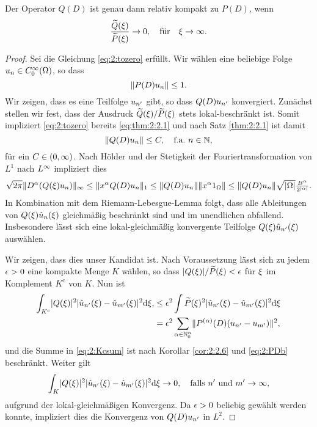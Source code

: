 \begin{thm}
Der Operator $Q(D)$ ist genau dann relativ kompakt zu $P(D)$,
wenn
\begin{equation}\label{eq:2:tozero}
\frac{\widetilde{Q}(\xi)}{\widetilde{P}(\xi)}\to0,\quad\text{für}\quad\xi\to\infty.
\end{equation}
\end{thm}
\begin{proof}
Sei die Gleichung \eqref{eq:2:tozero} erfüllt.
Wir wählen eine beliebige Folge $u_n\in C^\infty_0(\Omega)$,
so dass 
\begin{equation}\label{eq:2:PDb}
\lVert P(D)u_n\rVert\leq1.
\end{equation}
Wir zeigen, dass es eine Teilfolge $u_{n^\prime}$ gibt,
so dass $Q(D)u_{n^\prime}$ konvergiert.
Zunächst stellen wir fest, dass der Ausdruck $\widetilde{Q}(\xi)/\widetilde{P}(\xi)$
stets lokal-beschränkt ist.
Somit impliziert \eqref{eq:2:tozero} bereits \eqref{eq:thm:2:2.1}
und nach Satz \ref{thm:2:2.1} ist damit
\begin{equation}
\lVert Q(D)u_n\rVert\leq C,
\quad\text{f.a.}~n\in\mathbb N,
\end{equation}
für ein $C\in(0,\infty)$.
Nach Hölder und der Stetigkeit der Fouriertransformation
von $L^1$ nach $L^\infty$ impliziert dies
\begin{equation}
\sqrt{2\pi}\lVert D^\alpha(Q(\xi)u_n)\rVert_\infty\leq\lVert x^\alpha Q(D)u_n\rVert_1\leq\lVert Q(D)u_n\rVert\lVert x^\alpha1_\Omega\rVert
\leq\lVert Q(D)u_n\rVert\sqrt{\lvert\Omega\rvert}\tfrac{B^\alpha}{2^{\lvert\alpha\rvert}}.
\end{equation}
In Kombination mit dem Riemann-Lebesgue-Lemma folgt,
dass alle Ableitungen von $Q(\xi)\hat{u}_n(\xi)$
gleichmäßig beschränkt sind und im unendlichen abfallend.
Insbesondere lässt sich eine lokal-gleichmäßig konvergente Teilfolge $Q(\xi)\hat{u}_{n^\prime}(\xi)$ auswählen.

Wir zeigen, dass dies unser Kandidat ist.
Nach Voraussetzung lässt sich zu jedem $\epsilon>0$ eine kompakte Menge $K$ wählen,
so dass $\lvert Q(\xi)\rvert/\widetilde{P}(\xi)<\epsilon$ für $\xi$ im Komplement $K^{\mathrm c}$ von $K$.
Nun ist
\begin{align}
\int_{K^{\mathrm c}}\lvert Q(\xi)\rvert^2\lvert\hat{u}_{n^\prime}(\xi)-\hat{u}_{m^\prime}(\xi)\rvert^2\mathrm{d}\xi,
&\leq\epsilon^2\int\widetilde{P}(\xi)^2\lvert\hat{u}_{n^\prime}(\xi)-\hat{u}_{m^\prime}(\xi)\rvert^2\mathrm{d}\xi\\
&=\epsilon^2\sum_{\alpha\in\mathbb N^n_0}\lVert P^{(\alpha)}(D)(u_{n^\prime}-u_{m^\prime})\rVert^2,\label{eq:2:Kcsum}
\end{align}
und die Summe in \eqref{eq:2:Kcsum} ist nach Korollar \ref{cor:2:2.6}
und \eqref{eq:2:PDb} beschränkt.
Weiter gilt
\begin{equation}
\int_K\lvert Q(\xi)\rvert^2\lvert\hat{u}_{n^\prime}(\xi)-\hat{u}_{m^\prime}(\xi)\rvert^2\mathrm{d}\xi\to0,
\quad\text{falls}~n^\prime~\text{und}~m^\prime\to\infty,
\end{equation}
aufgrund der lokal-gleichmäßigen Konvergenz.
Da $\epsilon>0$ beliebig gewählt werden konnte,
impliziert dies die Konvergenz von $Q(D)u_{n^\prime}$ in $L^2$.


\end{proof}
